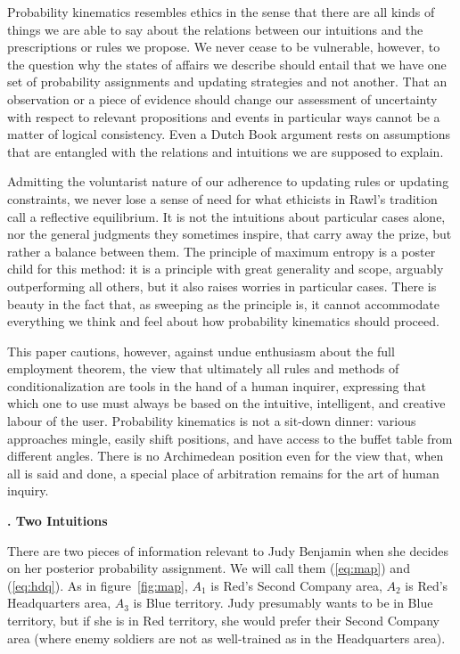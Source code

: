 \documentclass[12pt]{article}
\newcommand{\kapt}[1]{\textbf{{\thechap}. #1}\addtocounter{chap}{1}}
\begin{document}
Probability kinematics resembles ethics in the sense that there are
all kinds of things we are able to say about the relations between our
intuitions and the prescriptions or rules we propose. We never cease
to be vulnerable, however, to the question why the states of affairs
we describe should entail that we have one set of probability
assignments and updating strategies and not another. That an
observation or a piece of evidence should change our assessment of
uncertainty with respect to relevant propositions and events in
particular ways cannot be a matter of logical consistency. Even a
Dutch Book argument rests on assumptions that are entangled with the
relations and intuitions we are supposed to explain.

Admitting the voluntarist nature of our adherence to updating rules or
updating constraints, we never lose a sense of need for what ethicists
in Rawl's tradition call a reflective equilibrium. It is not the
intuitions about particular cases alone, nor the general judgments
they sometimes inspire, that carry away the prize, but rather a
balance between them. The principle of maximum entropy is a poster
child for this method: it is a principle with great generality and
scope, arguably outperforming all others, but it also raises worries
in particular cases. There is beauty in the fact that, as sweeping as
the principle is, it cannot accommodate everything we think and feel
about how probability kinematics should proceed.

This paper cautions, however, against undue enthusiasm about the full
employment theorem, the view that ultimately all rules and methods of
conditionalization are tools in the hand of a human inquirer,
expressing that which one to use must always be based on the
intuitive, intelligent, and creative labour of the user. Probability
kinematics is not a sit-down dinner: various approaches mingle, easily
shift positions, and have access to the buffet table from different
angles. There is no Archimedean position even for the view that, when
all is said and done, a special place of arbitration remains for the
art of human inquiry.

\kapt{Two Intuitions}

There are two pieces of information relevant to Judy Benjamin when she
decides on her posterior probability assignment. We will call them
({\ref{eq:map}}) and ({\ref{eq:hdq}}). As in figure~\ref{fig:map},
$A_{1}$ is Red's Second Company area, $A_{2}$ is Red's Headquarters
area, $A_{3}$ is Blue territory. Judy presumably wants to be in Blue
territory, but if she is in Red territory, she would prefer their
Second Company area (where enemy soldiers are not as well-trained as
in the Headquarters area).
\end{document}
